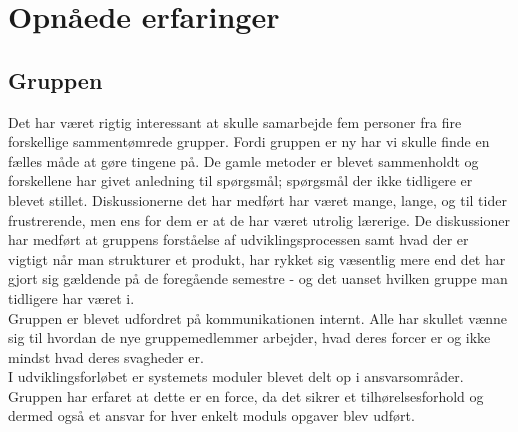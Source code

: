 \section{Opnåede erfaringer}
\label{ch:OpXP}

\subsection{Gruppen}
Det har været rigtig interessant at skulle samarbejde fem personer fra fire forskellige sammentømrede grupper. Fordi gruppen er ny har vi skulle finde en fælles måde at gøre tingene på. De gamle metoder er blevet sammenholdt og forskellene har givet anledning til spørgsmål; spørgsmål der ikke tidligere er blevet stillet. Diskussionerne det har medført har været mange, lange, og til tider frustrerende, men ens for dem er at de har været utrolig lærerige. De diskussioner har medført at gruppens forståelse af udviklingsprocessen samt hvad der er vigtigt når man strukturer et produkt, har rykket sig væsentlig mere end det har gjort sig gældende på de foregående semestre - og det uanset hvilken gruppe man tidligere har været i.\\
Gruppen er blevet udfordret på kommunikationen internt. Alle har skullet vænne sig til hvordan de nye gruppemedlemmer arbejder, hvad deres forcer er og ikke mindst hvad deres svagheder er.\\
I udviklingsforløbet er systemets moduler blevet delt op i ansvarsområder. Gruppen har erfaret at dette er en force, da det sikrer et tilhørelsesforhold og dermed også et ansvar for hver enkelt moduls opgaver blev udført.

